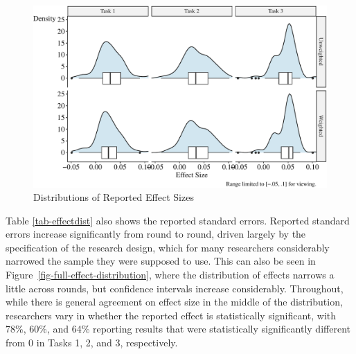 \documentclass[
  letterpaper,
  DIV=11,
  numbers=noendperiod]{scrartcl}
\begin{document}
\begin{figure}

{\centering \includegraphics{The-Sources-of-Researcher-Variation-in-Economics_files/figure-pdf/fig-effect-distributions-1.pdf}

}

\caption{\label{fig-effect-distributions}Distributions of Reported
Effect Sizes}

\end{figure}

Table \ref{tab-effectdist} also shows the reported standard errors.
Reported standard errors increase significantly from round to round,
driven largely by the specification of the research design, which for
many researchers considerably narrowed the sample they were supposed to
use. This can also be seen in Figure~\ref{fig-full-effect-distribution},
where the distribution of effects narrows a little across rounds, but
confidence intervals increase considerably. Throughout, while there is
general agreement on effect size in the middle of the distribution,
researchers vary in whether the reported effect is statistically
significant, with 78\%, 60\%, and 64\% reporting results that were
statistically significantly different from 0 in Tasks 1, 2, and 3,
respectively.
\end{document}
